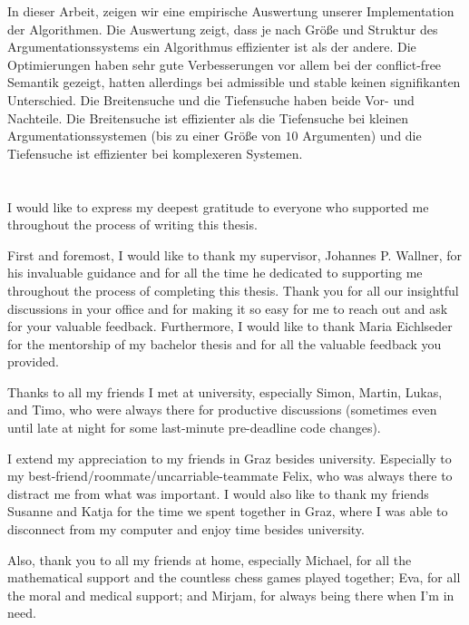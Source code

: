 \documentclass[twoside,openright]{scrreprt}
\begin{document}
In dieser Arbeit, zeigen wir eine empirische Auswertung unserer Implementation der Algorithmen. Die Auswertung zeigt, dass je nach Größe und Struktur des Argumentationssystems ein Algorithmus effizienter ist als der andere. Die Optimierungen haben sehr gute Verbesserungen vor allem bei der conflict-free Semantik gezeigt, hatten allerdings bei admissible und stable keinen signifikanten Unterschied. Die Breitensuche und die Tiefensuche haben beide Vor- und Nachteile. Die Breitensuche ist effizienter als die Tiefensuche bei kleinen Argumentationssystemen (bis zu einer Größe von $10$ Argumenten) und die Tiefensuche ist effizienter bei komplexeren Systemen.



\cleardoublepage

\chapter*{}

I would like to express my deepest gratitude to everyone who supported me throughout the process of writing this thesis.

First and foremost, I would like to thank my supervisor, Johannes P. Wallner, for his invaluable guidance and for all the time he dedicated to supporting me throughout the process of completing this thesis. Thank you for all our insightful discussions in your office and for making it so easy for me to reach out and ask for your valuable feedback. Furthermore, I would like to thank Maria Eichlseder for the mentorship of my bachelor thesis and for all the valuable feedback you provided.

Thanks to all my friends I met at university, especially Simon, Martin, Lukas, and Timo, who were always there for productive discussions (sometimes even until late at night for some last-minute pre-deadline code changes).

I extend my appreciation to my friends in Graz besides university. Especially to my best-friend/roommate/uncarriable-teammate Felix, who was always there to distract me from what was important. I would also like to thank my friends Susanne and Katja for the time we spent together in Graz, where I was able to disconnect from my computer and enjoy time besides university.

Also, thank you to all my friends at home, especially Michael, for all the mathematical support and the countless chess games played together; Eva, for all the moral and medical support; and Mirjam, for always being there when I'm in need.
\end{document}
